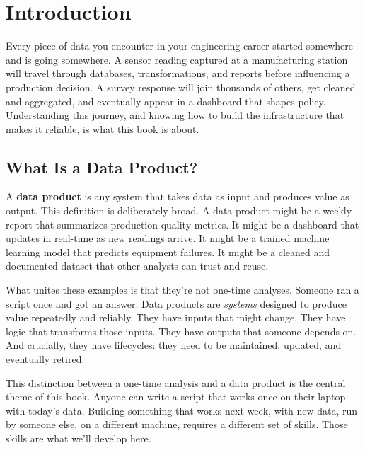 \documentclass[
  letterpaper,
  DIV=11,
  numbers=noendperiod]{scrreprt}
\begin{document}

\chapter*{Introduction}\label{introduction}


Every piece of data you encounter in your engineering career started
somewhere and is going somewhere. A sensor reading captured at a
manufacturing station will travel through databases, transformations,
and reports before influencing a production decision. A survey response
will join thousands of others, get cleaned and aggregated, and
eventually appear in a dashboard that shapes policy. Understanding this
journey, and knowing how to build the infrastructure that makes it
reliable, is what this book is about.

\section*{What Is a Data Product?}\label{what-is-a-data-product}


A \textbf{data product} is any system that takes data as input and
produces value as output. This definition is deliberately broad. A data
product might be a weekly report that summarizes production quality
metrics. It might be a dashboard that updates in real-time as new
readings arrive. It might be a trained machine learning model that
predicts equipment failures. It might be a cleaned and documented
dataset that other analysts can trust and reuse.

What unites these examples is that they're not one-time analyses.
Someone ran a script once and got an answer. Data products are
\emph{systems} designed to produce value repeatedly and reliably. They
have inputs that might change. They have logic that transforms those
inputs. They have outputs that someone depends on. And crucially, they
have lifecycles: they need to be maintained, updated, and eventually
retired.

This distinction between a one-time analysis and a data product is the
central theme of this book. Anyone can write a script that works once on
their laptop with today's data. Building something that works next week,
with new data, run by someone else, on a different machine, requires a
different set of skills. Those skills are what we'll develop here.
\end{document}
